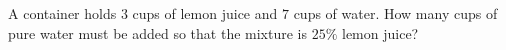 A container holds $3$ cups of lemon juice and $7$ cups of water. How many cups of pure water must be added so that the mixture is $25\%$ lemon juice?
